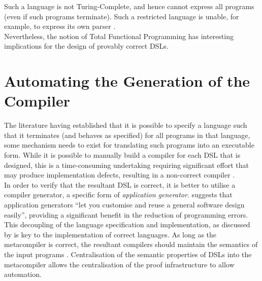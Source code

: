 Such a language is not Turing-Complete, and hence cannot express all programs (even if such programs terminate). 
Such a restricted language is unable, for example, to express its own parser \citep{turner2004total}.\\

Nevertheless, the notion of Total Functional Programming has interesting implications for the design of provably correct DSLs.



\section{Automating the Generation of the Compiler} %
\label{sec:automating_the_generation_of_the_compiler}

The literature having established that it is possible to specify a language such that it terminates (and behaves as specified) for all programs in that language, some mechanism needs to exist for translating such programs into an executable form.
While it is possible to manually build a compiler for each DSL that is designed, this is a time-consuming undertaking requiring significant effort that may produce implementation defects, resulting in a non-correct compiler \citep{Mernik:2005:DDL:1118890.1118892}.\\

In order to verify that the resultant DSL is correct, it is better to utilise a compiler generator, a specific form of \textit{application generator}.
\citet{cleaveland1988building} suggests that application generators ``let you customise and reuse a general software design easily'', providing a significant benefit in the reduction of programming errors.\\

This decoupling of the language specification and implementation, as discussed by \citet{cleaveland1988building} is key to the implementation of correct languages.
As long as the metacompiler is correct, the resultant compilers should maintain the semantics of the input programs \citep{Gray:1992:ECF:129630.129637}.
Centralisation of the semantic properties of DSLs into the metacompiler allows the centralisation of the proof infrastructure to allow automation.

